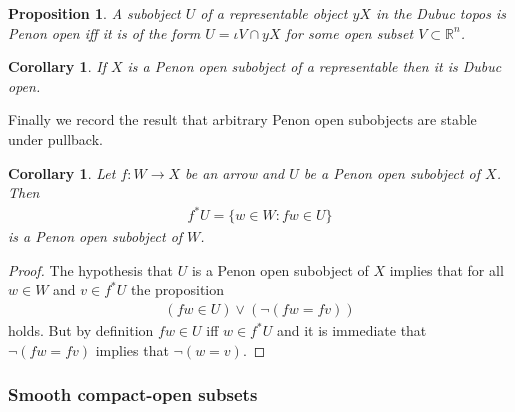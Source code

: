 \documentclass[10pt,a4paper]{amsart}
\numberwithin{equation}{section}
\newtheorem{Corollary}[Theorem]{Corollary}
\newtheorem{Proposition}[Theorem]{Proposition}
{ \theoremstyle{definition}
\newtheorem{Definition}[Theorem]{Definition}
\newtheorem{Notation}[Theorem]{Notation}
\newtheorem{Example}[Theorem]{Example}
\newtheorem{Remark}[Theorem]{Remark} }
\begin{document}
\begin{Proposition}\label{Penon-iff-Dubuc-on-representables}
A subobject $U$ of a representable object $yX$ in the Dubuc topos is Penon open iff it is of the form $U=\iota V\cap yX$ for some open subset $V\subset\mathbb{R}^{n}$.
\end{Proposition}
\begin{Corollary}\label{cor:penon-implies-dubuc}
 If $X$ is a Penon open subobject of a representable then it is Dubuc open.
\end{Corollary}
Finally we record the result that arbitrary Penon open subobjects are stable under pullback.

\begin{Corollary}
 Let $f \colon W \rightarrow X$ be an arrow and $ U $ be a Penon open subobject of $ X $. Then
\begin{gather*}
 f ^* U = \{ w \in W \colon f w \in U \}
\end{gather*}
is a Penon open subobject of $W$.
\end{Corollary}
\begin{proof}
 The hypothesis that $ U $ is a Penon open subobject of $ X $ implies that for all $w \in W$ and $v \in f ^* U$ the proposition
 \begin{gather*}
 ( fw \in U ) \vee ( \neg ( fw = fv ) )
 \end{gather*}
 holds. But by def\/inition $ fw \in U $ if\/f $ w \in f^*U $ and it is immediate that $ \neg ( fw = fv )$ implies that $ \neg (w = v )$.
\end{proof}

\subsubsection{Smooth compact-open subsets}\label{sec:smooth-compact-open-subsets}
\end{document}
